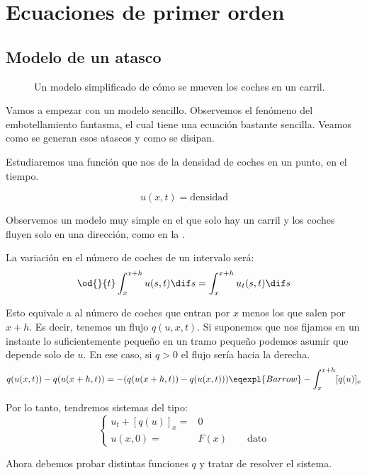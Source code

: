 \chapter{Ecuaciones de primer orden}

\section{Modelo de un atasco}

	\begin{figure}[thbp]
	\centering
	\caption{Un modelo simplificado de cómo se mueven los coches en un carril.}
	\label{fig:CochesCarril}
	\end{figure}

	Vamos a empezar con un modelo sencillo. Observemos el fenómeno del embotellamiento fantasma, el cual tiene una ecuación bastante sencilla. Veamos como se generan esos atascos y como se disipan.

	Estudiaremos una función que nos de la densidad de coches en un punto, en el tiempo.

	$$u(x,t) = \text{densidad}$$

	Observemos un modelo muy simple en el que solo hay un carril y los coches fluyen solo en una dirección, como en la .

	La variación en el número de coches de un intervalo será:
	\[ \od{}{t} \int^{x+h}_{x} u(s,t) \dif s = \int^{x+h}_{x} u_t(s,t) \dif s \]

	Esto equivale a al número de coches que entran por $x$ menos los que salen por $x + h$. Es decir, tenemos un flujo $q(u, x, t)$. Si suponemos que nos fijamos en un instante lo suficientemente pequeño en un tramo pequeño podemos asumir que depende solo de $u$. En ese caso, si $q > 0$ el flujo sería hacia la derecha.
	\[ q(u(x,t)) - q(u(x+h,t)) = -( q(u(x+h,t)) -  q(u(x,t)) ) \eqexpl{Barrow} -\int^{x+h}_{x} [q(u)]_{x}
	\]

	Por lo tanto, tendremos sistemas del tipo:
	\begin{equation*}
	\left\{
	\begin{array}{rl}
	u_t + [q(u)]_{x} =&\!\!\! 0 \\
	u(x, 0) =&\!\!\! F(x) \quad \quad \text{dato}
	\end{array}
	\right.
	\end{equation*}

	Ahora debemos probar distintas funciones $q$ y tratar de resolver el sistema.

